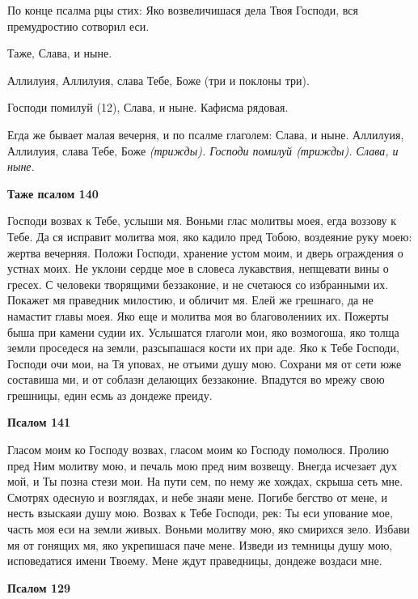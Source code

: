 По конце псалма рцы стих: Яко возвеличишася дела Твоя Господи, вся премудростию сотворил еси.


Таже, Слава, и ныне.


Аллилуия, Аллилуия, слава Тебе, Боже (три и поклоны три).


Господи помилуй (12), Слава, и ныне. Кафисма рядовая.


Егда же бывает малая вечерня, и по псалме глаголем: Слава, и ныне. Аллилуия, Аллилуия, слава Тебе, Боже \itshape (трижды)\normalfont{}. Господи помилуй \itshape (трижды)\normalfont{}. Слава, и ныне.





\bfseries Таже псалом 140\normalfont{}


Господи возвах к Тебе, услыши мя. Воньми глас молитвы моея, егда воззову к Тебе. Да ся исправит молитва моя, яко кадило пред Тобою, воздеяние руку моею: жертва вечерняя. Положи Господи, хранение устом моим, и дверь ограждения о устнах моих. Не уклони сердце мое в словеса лукавствия, непщевати вины о гресех. С человеки творящими беззаконие, и не счетаюся со избранными их. Покажет мя праведник милостию, и обличит мя. Елей же грешнаго, да не намастит главы моея. Яко еще и молитва моя во благоволениих их. Пожерты быша при камени судии их. Услышатся глаголи мои, яко возмогоша, яко толща земли проседеся на земли, разсыпашася кости их при аде. Яко к Тебе Господи, Господи очи мои, на Тя уповах, не отъими душу мою. Сохрани мя от сети юже составиша ми, и от соблазн делающих беззаконие. Впадутся во мрежу свою грешницы, един есмь аз дондеже преиду.





\bfseries Псалом 141\normalfont{}


Гласом моим ко Господу возвах, гласом моим ко Господу помолюся. Пролию пред Ним молитву мою, и печаль мою пред ним возвещу. Внегда исчезает дух мой, и Ты позна стези мои. На пути сем, по нему же хождах, скрыша сеть мне. Смотрях одесную и возглядах, и небе знаяи мене. Погибе бегство от мене, и несть взыскаяи душу мою. Возвах к Тебе Господи, рек: Ты еси упование мое, часть моя еси на земли живых. Воньми молитву мою, яко смирихся зело. Избави мя от гонящих мя, яко укрепишася паче мене. Изведи из темницы душу мою, исповедатися имени Твоему. Мене ждут праведницы, дондеже воздаси мне.





\bfseries Псалом 129\normalfont{}


